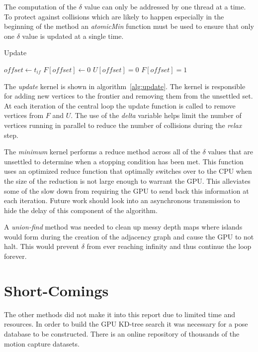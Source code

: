 \documentclass[conference]{IEEEtran}
\begin{document}
The computation of the $\delta$ value can only be addressed by one thread at a time. To protect against collisions which are likely to happen especially in the beginning of the method an \emph{atomicMin} function must be used to ensure that only one $\delta$ value is updated at a single time.
\begin{algorithm}
\caption{Update}
\label{alg:update}
  \begin{algorithmic}[1]
    \STATE $offset \leftarrow t_{if}$
    \STATE $F[offset] \leftarrow 0$
      \STATE $U[offset] = 0$
      \STATE $F[offset] = 1$
    \ENDIF
  \end{algorithmic}
\end{algorithm}
The \emph{update} kernel is shown in algorithm~\ref{alg:update}. The kernel is responsible for adding new vertices to the frontier and removing them from the unsettled set. At each iteration of the central loop the update function is called to remove vertices from $F$ and $U$. The use of the \emph{delta} variable helps limit the number of vertices running in parallel to reduce the number of collisions during the \emph{relax} step.

The \emph{minimum} kernel performs a reduce method across all of the $\delta$ values that are unsettled to determine when a stopping condition has been met. This function uses an optimized reduce function that optimally switches over to the CPU when the size of the reduction is not large enough to warrant the GPU. This alleviates some of the slow down from requiring the GPU to send back this information at each iteration. Future work should look into an asynchronous transmission to hide the delay of this component of the algorithm.

A \emph{union-find} method was needed to clean up messy depth maps where islands would form during the creation of the adjacency graph and cause the GPU to not halt. This would prevent $\delta$ from ever reaching infinity and thus continue the loop forever.

\section{Short-Comings}
\label{sec:short}
The other methods did not make it into this report due to limited time and resources. In order to build the GPU KD-tree search it was necessary for a pose database to be constructed. There is an online repository of thousands of the motion capture datasets.
\end{document}
